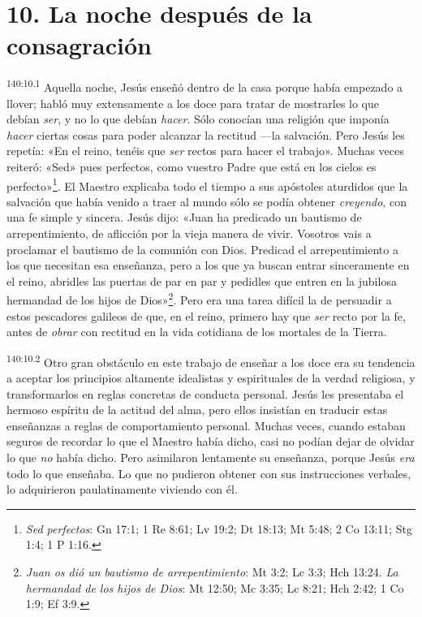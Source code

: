 \section*{10. La noche después de la consagración}
\par 
\textsuperscript{140:10.1} Aquella noche, Jesús enseñó dentro de la casa porque había empezado a llover; habló muy extensamente a los doce para tratar de mostrarles lo que debían \textit{ser}, y no lo que debían \textit{hacer}. Sólo conocían una religión que imponía \textit{hacer} ciertas cosas para poder alcanzar la rectitud ---la salvación. Pero Jesús les repetía: «En el reino, tenéis que \textit{ser} rectos para hacer el trabajo». Muchas veces reiteró: «Sed» pues perfectos, como vuestro Padre que está en los cielos es perfecto»\footnote{\textit{Sed perfectos}: Gn 17:1; 1 Re 8:61; Lv 19:2; Dt 18:13; Mt 5:48; 2 Co 13:11; Stg 1:4; 1 P 1:16.}. El Maestro explicaba todo el tiempo a sus apóstoles aturdidos que la salvación que había venido a traer al mundo sólo se podía obtener \textit{creyendo}, con una fe simple y sincera. Jesús dijo: «Juan ha predicado un bautismo de arrepentimiento, de aflicción por la vieja manera de vivir. Vosotros vais a proclamar el bautismo de la comunión con Dios. Predicad el arrepentimiento a los que necesitan esa enseñanza, pero a los que ya buscan entrar sinceramente en el reino, abridles las puertas de par en par y pedidles que entren en la jubilosa hermandad de los hijos de Dios»\footnote{\textit{Juan os dió un bautismo de arrepentimiento}: Mt 3:2; Lc 3:3; Hch 13:24. \textit{La hermandad de los hijos de Dios}: Mt 12:50; Mc 3:35; Lc 8:21; Hch 2:42; 1 Co 1:9; Ef 3:9.}. Pero era una tarea difícil la de persuadir a estos pescadores galileos de que, en el reino, primero hay que \textit{ser} recto por la fe, antes de \textit{obrar} con rectitud en la vida cotidiana de los mortales de la Tierra.

\par 
\textsuperscript{140:10.2} Otro gran obstáculo en este trabajo de enseñar a los doce era su tendencia a aceptar los principios altamente idealistas y espirituales de la verdad religiosa, y transformarlos en reglas concretas de conducta personal. Jesús les presentaba el hermoso espíritu de la actitud del alma, pero ellos insistían en traducir estas enseñanzas a reglas de comportamiento personal. Muchas veces, cuando estaban seguros de recordar lo que el Maestro había dicho, casi no podían dejar de olvidar lo que \textit{no} había dicho. Pero asimilaron lentamente su enseñanza, porque Jesús \textit{era} todo lo que enseñaba. Lo que no pudieron obtener con sus instrucciones verbales, lo adquirieron paulatinamente viviendo con él.

